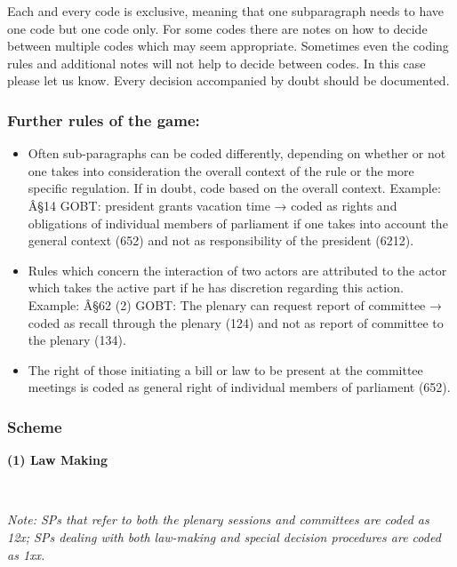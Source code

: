 \documentclass[]{article}
\begin{document}
Each and every code is exclusive, meaning that one subparagraph needs to
have one code but one code only. For some codes there are notes on how
to decide between multiple codes which may seem appropriate. Sometimes
even the coding rules and additional notes will not help to decide
between codes. In this case please let us know. Every decision
accompanied by doubt should be documented.

\subsubsection{Further rules of the
game:}\label{further-rules-of-the-game}

\begin{itemize}
\item
  Often sub-paragraphs can be coded differently, depending on whether or
  not one takes into consideration the overall context of the rule or
  the more specific regulation. If in doubt, code based on the overall
  context. Example: Â§14 GOBT: president grants vacation time → coded as
  rights and obligations of individual members of parliament if one
  takes into account the general context (652) and not as responsibility
  of the president (6212).
\item
  Rules which concern the interaction of two actors are attributed to
  the actor which takes the active part if he has discretion regarding
  this action. Example: Â§62 (2) GOBT: The plenary can request report of
  committee → coded as recall through the plenary (124) and not as
  report of committee to the plenary (134).
\item
  The right of those initiating a bill or law to be present at the
  committee meetings is coded as general right of individual members of
  parliament (652).
\end{itemize}

\subsubsection{Scheme}\label{scheme}

\textbf{(1) Law Making}

~

\emph{Note: SPs that refer to both the plenary sessions and committees
are coded as 12x; SPs dealing with both law-making and special decision
procedures are coded as 1xx.}
\end{document}
